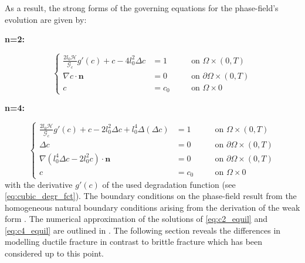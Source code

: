 As a result, the strong forms of the governing equations for the phase-field's evolution are given by:

\textbf{n=2:}

\begin{equation} \label{eq:c2_equil}
		 \left\{\begin{alignedat}{2}
\frac{2l_{0}\mathcal{H}}{\mathcal{G}_{c}}g'\left(c\right) + c - 4l_{0}^{2}\Delta c &= 1 && \quad\text{on } \Omega\times\left(0,T\right) \\
\nabla c\cdot\mathbf{n} &= 0 && \quad \text{on } \partial\Omega\times\left(0,T\right) \\
c &= c_{0} && \quad \text{on } \Omega\times0  
\end{alignedat}\right.
\end{equation}

\textbf{n=4:}

\begin{equation} \label{eq:c4_equil}
		 \left\{\begin{alignedat}{2}
\frac{2l_{0}\mathcal{H}}{\mathcal{G}_{c}}g'\left(c\right) + c - 2l_{0}^{2}\Delta c + l_{0}^{4}\Delta\left(\Delta c\right) &= 1 && \quad\text{on } \Omega\times\left(0,T\right) \\
\Delta c &= 0 && \quad \text{on } \partial\Omega\times\left(0,T\right) \\
\nabla\left(l_{0}^{4}\Delta c-2l_{0}^{2}c\right)\cdot\mathbf{n} &= 0 && \quad \text{on } \partial\Omega\times\left(0,T\right) \\
c &= c_{0} && \quad \text{on } \Omega\times0  
\end{alignedat}\right.
\end{equation}
with the derivative $g'\left(c\right)$ of the used degradation function (see \eqref{eq:cubic_degr_fct}). The boundary conditions on the phase-field result from the homogeneous natural boundary conditions arising from the derivation of the weak form \citep{11_PF_DissBorden}. The numerical approximation of the solutions of \eqref{eq:c2_equil} and \eqref{eq:c4_equil} are outlined in . The following section reveals the differences in modelling ductile fracture in contrast to brittle fracture which has been considered up to this point.

